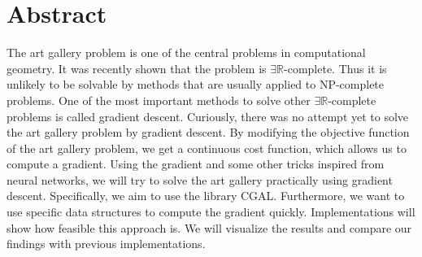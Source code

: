 \section*{Abstract}


The art gallery problem is one of the central problems in computational geometry. It was recently shown that the problem is $\exists \mathbb{R}$-complete. Thus it is unlikely to be solvable by methods that are usually applied to NP-complete problems. One of the most important methods to solve other $\exists \mathbb{R}$-complete problems is called gradient descent. Curiously, there was no attempt yet to solve the art gallery problem by gradient descent. By modifying the objective function of the art gallery problem, we get a continuous cost function, which allows us to compute a gradient. Using the gradient and some other tricks inspired from neural networks, we will try to solve the art gallery practically using gradient descent. Specifically, we aim to use the library CGAL. Furthermore, we want to use specific data structures to compute the gradient quickly. Implementations will show how feasible this approach is. We will visualize the results and compare our findings with previous implementations.